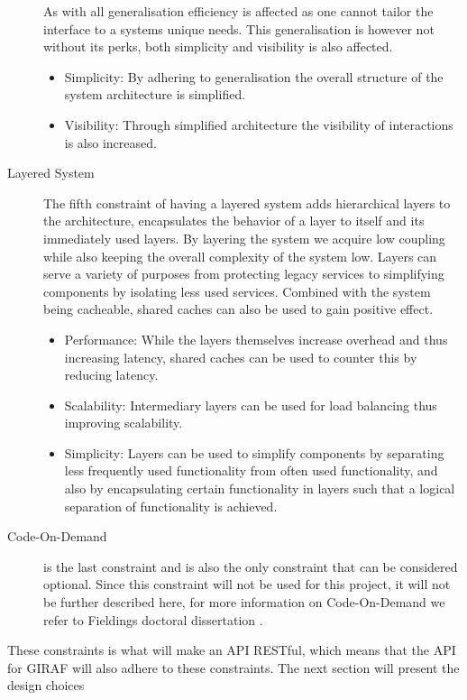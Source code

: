 \begin{description}
    As with all generalisation efficiency is affected as one cannot tailor the interface to a systems unique needs.
    This generalisation is however not without its perks, both simplicity and visibility is also affected.
    \begin{itemize}
        \item Simplicity: By adhering to generalisation the overall structure of the system architecture is simplified.
        \item Visibility: Through simplified architecture the visibility of interactions is also increased.
    \end{itemize}
    \item [Layered System]\label{layeredsystem}The fifth constraint of having a layered system adds hierarchical layers to the architecture, encapsulates the behavior of a layer to itself and its immediately used layers.
    By layering the system we acquire low coupling while also keeping the overall complexity of the system low.
    Layers can serve a variety of purposes from protecting legacy services to simplifying components by isolating less used services.
    Combined with the system being cacheable, shared caches can also be used to gain positive effect.
    \begin{itemize}
        \item Performance: While the layers themselves increase overhead and thus increasing latency, shared caches can be used to counter this by reducing latency.
        \item Scalability: Intermediary layers can be used for load balancing thus improving scalability.
        \item Simplicity: Layers can be used to simplify components by separating less frequently used functionality from often used functionality, and also by encapsulating certain functionality in layers such that a logical separation of functionality is achieved.
    \end{itemize}
    \item [Code-On-Demand] is the last constraint and is also the only constraint that can be considered optional.
    Since this constraint will not be used for this project, it will not be further described here, for more information on Code-On-Demand we refer to Fieldings doctoral dissertation \citep{fielding2000rest}.
\end{description}

These constraints is what will make an API RESTful, which means that the API for GIRAF will also adhere to these constraints.
The next section will present the design choices
